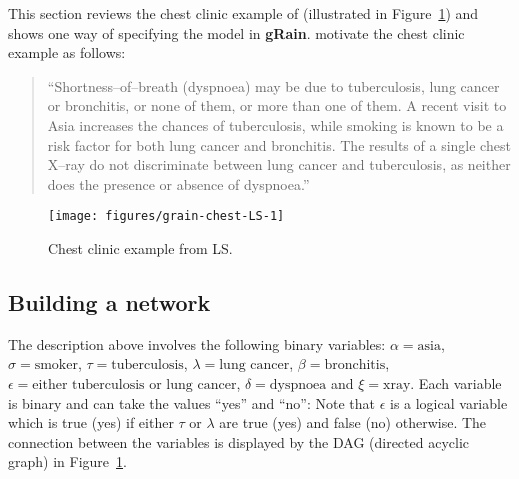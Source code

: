 \documentclass[10pt]{article}\usepackage[]{graphicx}\usepackage[]{color}
\makeatletter
\def\maxwidth{ %
  \ifdim\Gin@nat@width>\linewidth
    \linewidth
  \else
    \Gin@nat@width
  \fi
}
\newenvironment{knitrout}{}{} %
\def\grbn{{\bf gRain}}
\makeatother
\begin{document}
This section reviews the chest clinic example of \cite{lau/spieg:88}
(illustrated in Figure~\ref{fig:chest-LS}) and shows one way of
specifying the model in \grbn{}.  \cite{lau/spieg:88} motivate the
chest clinic example as follows:

\begin{quote}
  ``Shortness--of--breath (dyspnoea) may be due to tuberculosis, lung
  cancer or bronchitis, or none of them, or more than one of them. A
  recent visit to Asia increases the chances of tuberculosis, while
  smoking is known to be a risk factor for both lung cancer and
  bronchitis. The results of a single chest X--ray do not discriminate
  between lung cancer and tuberculosis, as neither does the presence or
  absence of dyspnoea.''
\end{quote}


\begin{knitrout}
\color{fgcolor}\begin{figure}
\texttt{[image: figures/grain-chest-LS-1]} \caption[Chest clinic example from LS]{Chest clinic example from LS.}\label{fig:chest-LS}
\end{figure}


\end{knitrout}


\subsection{Building a network}

The description above involves the following binary variables:
$\alpha=\mbox{asia}$,
$\sigma=\mbox{smoker}$,
$\tau=\mbox{tuberculosis}$,
$\lambda=\mbox{lung cancer}$,
$\beta=\mbox{bronchitis}$,
$\epsilon=\mbox{either tuberculosis or lung cancer}$,
$\delta=\mbox{dyspnoea}$ and
$\xi=\mbox{xray}$. 
Each variable is binary and can take the values ``yes'' and ``no'':
Note that $\epsilon$ is a logical variable which is
true (yes) if either $\tau$ or $\lambda$ are true (yes) and false (no) otherwise.
The connection between the variables is displayed by the DAG (directed acyclic graph) in
Figure~\ref{fig:chest-LS}.
\end{document}
